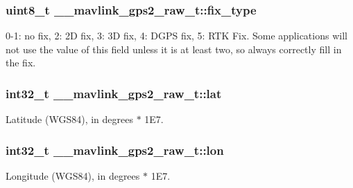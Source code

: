 \hypertarget{struct____mavlink__gps2__raw__t_a96227427865925b915a8bc067adfed2a}{
\subsubsection[{fix\+\_\+type}]{\setlength{\rightskip}{0pt plus 5cm}uint8\+\_\+t \+\_\+\+\_\+mavlink\+\_\+gps2\+\_\+raw\+\_\+t\+::fix\+\_\+type}}\label{struct____mavlink__gps2__raw__t_a96227427865925b915a8bc067adfed2a}


0-\/1\+: no fix, 2\+: 2\+D fix, 3\+: 3\+D fix, 4\+: D\+G\+P\+S fix, 5\+: R\+T\+K Fix. Some applications will not use the value of this field unless it is at least two, so always correctly fill in the fix. 

\hypertarget{struct____mavlink__gps2__raw__t_a8e41540c2162784e3e4956ba678413c0}{
\subsubsection[{lat}]{\setlength{\rightskip}{0pt plus 5cm}int32\+\_\+t \+\_\+\+\_\+mavlink\+\_\+gps2\+\_\+raw\+\_\+t\+::lat}}\label{struct____mavlink__gps2__raw__t_a8e41540c2162784e3e4956ba678413c0}


Latitude (W\+G\+S84), in degrees $\ast$ 1\+E7. 

\hypertarget{struct____mavlink__gps2__raw__t_a37b1686f9653b3c0eaa4880de4eb658b}{
\subsubsection[{lon}]{\setlength{\rightskip}{0pt plus 5cm}int32\+\_\+t \+\_\+\+\_\+mavlink\+\_\+gps2\+\_\+raw\+\_\+t\+::lon}}\label{struct____mavlink__gps2__raw__t_a37b1686f9653b3c0eaa4880de4eb658b}


Longitude (W\+G\+S84), in degrees $\ast$ 1\+E7. 

